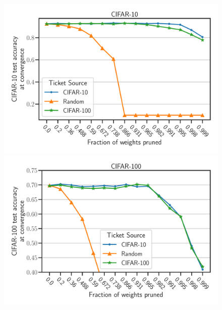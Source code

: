     \begin{figure}[]
        \centering
        \begin{minipage}{.497\textwidth}
        \includegraphics[width=\textwidth]{../openreview/plots/Exp2_VGG_CIFAR10_N.pdf}
        \end{minipage}
        \begin{minipage}{.497\textwidth}
        \includegraphics[width=\textwidth]{../openreview/plots/Exp2_VGG_CIFAR100_N1.pdf}
        \end{minipage}
        \begin{minipage}{.497\textwidth}
       

\end{minipage}
\end{figure}
